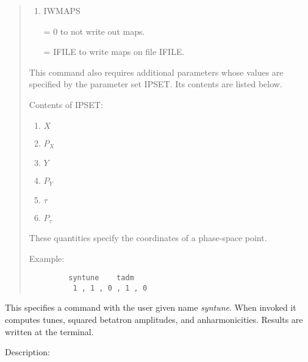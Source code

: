 \begin{quotation}
\begin{enumerate}
      \item  IWMAPS

             = 0 to not write out maps.

             = IFILE to write maps on file IFILE.
\end{enumerate}

This  command also requires additional parameters whose values are
specified by the parameter set IPSET.  Its contents are listed below.

\noindent Contents of IPSET:
\begin{enumerate}
\item $X$
\item $P_X$
\item $Y$
\item $P_Y$
\item $\tau$
\item $P_{\tau}$
\end{enumerate}
These quantities specify the coordinates of a phase-space point.

\vspace{5mm}
\noindent     Example:
\begin{verbatim}
         syntune    tadm
          1 , 1 , 0 , 1 , 0
\end{verbatim}
\end{quotation}
This specifies a command with the user given name {\em syntune}.  When invoked it computes tunes, squared betatron amplitudes, and anharmonicities.     Results are written at the terminal.

\vspace{5mm}
     Description:
\vspace{2mm}

